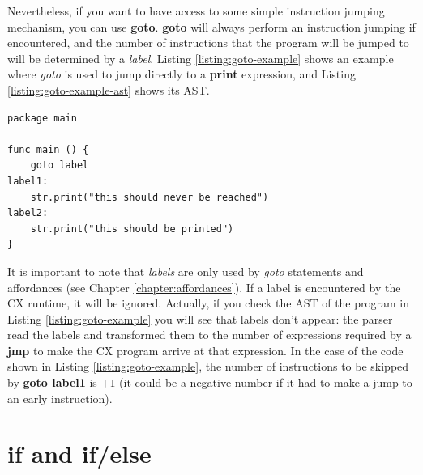 \documentclass[11pt,fleqn,openany]{book} %
\begin{document}
Nevertheless, if you want to have access to some simple instruction jumping mechanism, you can use \textbf{goto}. \textbf{goto} will always perform an instruction jumping if encountered, and the number of instructions that the program will be jumped to will be determined by a \emph{label}. Listing \ref{listing:goto-example} shows an example where \emph{goto} is used to jump directly to a \textbf{print} expression, and Listing \ref{listing:goto-example-ast} shows its AST.

\begin{lstlisting}[caption={Using $goto$ for Control Flow},captionpos=b,label={listing:goto-example}]
package main

func main () {
	goto label
label1:
	str.print("this should never be reached")
label2:
	str.print("this should be printed")
}
\end{lstlisting}

It is important to note that \emph{labels} are only used by \emph{goto} statements and affordances (see Chapter \ref{chapter:affordances}). If a label is encountered by the CX runtime, it will be ignored. Actually, if you check the AST of the program in Listing \ref{listing:goto-example} you will see that labels don't appear: the parser read the labels and transformed them to the number of expressions required by a \textbf{jmp} to make the CX program arrive at that expression. In the case of the code shown in Listing \ref{listing:goto-example}, the number of instructions to be skipped by \textbf{goto label1} is $+1$ (it could be a negative number if it had to make a jump to an early instruction).

\section{if and if/else}

\end{document}
